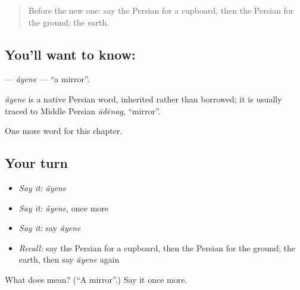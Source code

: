 \begin{quote}
Before the new one: say the Persian for a cupboard, then the Persian for the ground; the earth.
\end{quote}

\subsection*{You'll want to know: }
\textbf{} — \emph{âyene} — \textquotedblleft{}a mirror\textquotedblright{}.

\begin{cousinweb}
\emph{âyene} is a native Persian word, inherited rather than borrowed; it is usually traced to Middle Persian \emph{ādēnag}, \textquotedblleft{}mirror\textquotedblright{}.
\end{cousinweb}

\begin{grammarlens}[title={What you've built}]
One more word for this chapter.
\end{grammarlens}

\subsection*{Your turn}
\begin{itemize}
\raggedright
  \item \emph{Say it:} \emph{âyene}
  \item \emph{Say it:} \emph{âyene}, once more
  \item \emph{Say it:} say \emph{âyene}
  \item \emph{Recall:} say the Persian for a cupboard, then the Persian for the ground; the earth, then say \emph{âyene} again
\end{itemize}

\begin{tcolorbox}[breakable,colback=teal!4,colframe=teal!35!black,title={Before you move on}]
What does  mean? (\textquotedblleft{}A mirror\textquotedblright{}.) Say it once more.
\end{tcolorbox}
